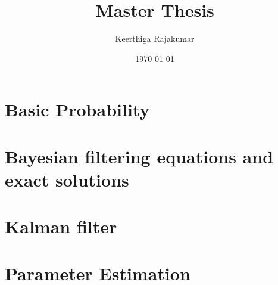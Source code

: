 \documentclass{article}
\title{Master Thesis}
\author{Keerthiga Rajakumar}
\date{\today}
\theoremstyle{plain} %
\theoremstyle{definition} %
\theoremstyle{remark} %
\begin{document}

\maketitle
\newpage

\tableofcontents %

\newpage

\setcounter{page}{1} %

\section{Basic Probability}


\newpage
\section{Bayesian filtering equations and exact solutions}


\newpage
\section{Kalman filter}


\newpage
\section{Parameter Estimation}

\end{document}
